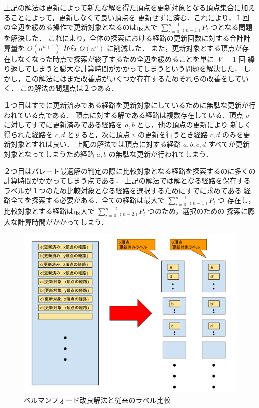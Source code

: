 \documentclass[12pt]{optlab-bachelor}
\begin{document}
上記の解法は更新によって新たな解を得た頂点を更新対象となる頂点集合に加えることによって，更新しなくて良い頂点を
更新せずに済む．これにより，１回の全辺を緩める操作で更新対象となるのは最大で
$\displaystyle \sum_{i=0}^{n-1} {}_{(n-1)}P_i$ つとなる問題を解決した．
これにより，全体の探索における経路の更新回数に対する合計計算量を $O(n^{n+1})$ から $O(n^n)$ に削減した．
また，更新対象とする頂点が存在しなくなった時点で探索が終了するため全辺を緩めることを単に $|V|-1$ 回
繰り返してしまうと膨大な計算時間がかかってしまうという問題を解決した．
しかし，この解法にはまだ改善点がいくつか存在するためそれらの改善をしていく．
この解法の問題点は２つある．

１つ目はすでに更新済みである経路を更新対象にしているために無駄な更新が行われている点である．
頂点に対する解である経路は複数存在している．頂点 $v$ に対してすでに更新済みである経路を $a,b$ とし，他の頂点の更新により
新しく得られた経路を $c,d$ とすると，次に頂点 $v$ の更新を行うとき経路 $c,d$ のみを更新対象とすれば良い．
上記の解法では頂点に対する経路 $a,b,c,d$ すべてが更新対象となってしまうため経路 $a,b$ の無駄な更新が行われてしまう．

２つ目はパレート最適解の判定の際に比較対象となる経路を探索するのに多くの計算時間がかかってしまう点である．
上記の解法では解となる経路を保存するラベルが１つのため比較対象となる経路を選択するためにすでに求めてある
経路全てを探索する必要がある．全ての経路は最大で $\displaystyle \sum_{i=0}^{n-1} {}_{(n-1)}P_i$ つ
存在し，比較対象とする経路は最大で $\displaystyle \sum_{i=0}^{n-2} {}_{(n-2)}P_i$ つのため，選択のための
探索に膨大な計算時間がかかってしまう．

\begin{figure}[htbp]
  \centering
  \caption{ベルマンフォード改良解法と従来のラベル比較}
  \includegraphics[width=12.0cm]{fig/fig3.pdf}
\end{figure}
\end{document}
